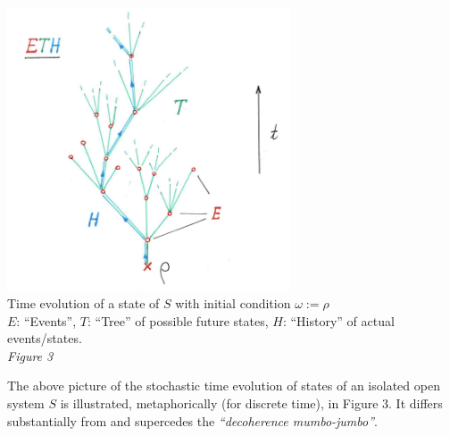 \documentclass[a4paper,11pt]{article}
\begin{document}
\begin{center}
\includegraphics[height=8.4cm]{ETH-new.png}\\
Time evolution of a state of $S$ with initial condition $\omega:= \rho$\\
{\color{red}$E$}: ``Events'', {\color{caribbeangreen}$T$}: ``Tree'' of possible future states, {\color{blue}$H$}: ``History'' of actual events/states.\\ 
\textit{Figure 3}
\end{center}
The above picture of the stochastic time evolution of states of an isolated open system $S$ is illustrated, metaphorically (for discrete time), in Figure 3. It differs substantially from and supercedes the \textit{``decoherence mumbo-jumbo''}.
\end{document}
